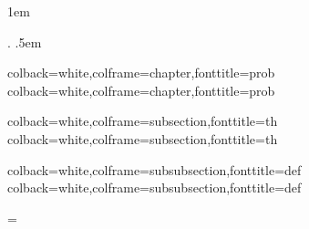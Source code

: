   {\topsep}         %
  {\topsep}         %
  {}                %
  {}                %
  {\bfseries}       %
  {\newline}        %
  {1em}             %
  {}                %

\theoremstyle{boldnewline}
\newtheorem{problem}{Problem}

{}
{}
{\upshape}
{}
{\bfseries}
{.}
{.5em}
{}
\theoremstyle{customthm}
\newtheorem{theorem}{Theorem}[chapter]
\newtheorem{definition}{Definition}[chapter]

%
{colback=white,colframe=chapter,fonttitle=\bfseries}{prob}
%
{colback=white,colframe=chapter,fonttitle=\bfseries}{prob}

%
{colback=white,colframe=subsection,fonttitle=\bfseries}{th}
%
{colback=white,colframe=subsection,fonttitle=\bfseries}{th}

%
{colback=white,colframe=subsubsection,fonttitle=\bfseries}{def}
%
{colback=white,colframe=subsubsection,fonttitle=\bfseries}{def}

\newtheorem*{researchq}{Research Question}
\newtheorem*{subsidiaryq}{Subsidiary Questions}

\usetikzlibrary{intersections, arrows.meta, calc}

\usepackage{pgf}
\usepackage{pgfplots}
\pgfplotsset{compat=1.14}
\usepackage{import}
\def\mathdefault#1{#1}
\everymath=\expandafter{\the\everymath\displaystyle}

\newif\ifshowcomments
\showcommentstrue
\ifshowcomments
    \newcommand{\mynote}[2]{\fbox{\bfseries\sffamily\scriptsize{#1}}
        {\small$\blacktriangleright$\textsf{\emph{#2}}$\blacktriangleleft$}}
    \newcommand{\citehere}[0]{\textcolor{red}{\fbox{\bfseries\sffamily\scriptsize{CITATION}}}}
\else
    \newcommand{\mynote}[2]{}
    \newcommand{\citehere}[0]{}
\fi
\newcommand{\todo}[1]{\textcolor{blue}{\mynote{To do}{#1}}}

